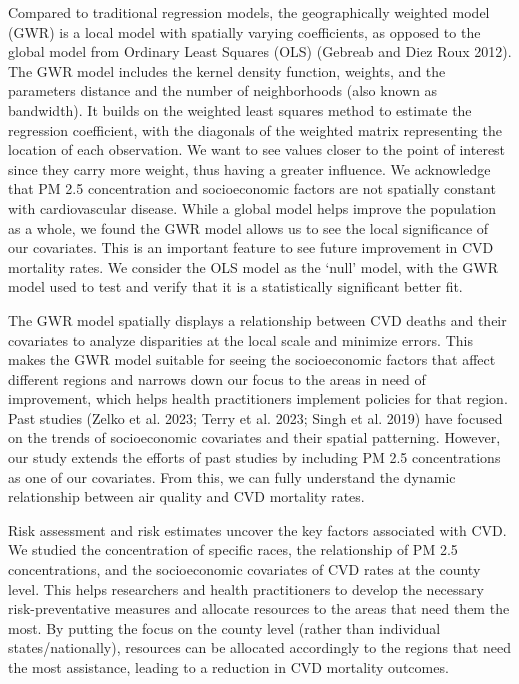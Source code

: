 \documentclass[
]{article}
\begin{document}
Compared to traditional regression models, the geographically weighted
model (GWR) is a local model with spatially varying coefficients, as
opposed to the global model from Ordinary Least Squares (OLS) (Gebreab
and Diez Roux 2012). The GWR model includes the kernel density function,
weights, and the parameters distance and the number of neighborhoods
(also known as bandwidth). It builds on the weighted least squares
method to estimate the regression coefficient, with the diagonals of the
weighted matrix representing the location of each observation. We want
to see values closer to the point of interest since they carry more
weight, thus having a greater influence. We acknowledge that PM 2.5
concentration and socioeconomic factors are not spatially constant with
cardiovascular disease. While a global model helps improve the
population as a whole, we found the GWR model allows us to see the local
significance of our covariates. This is an important feature to see
future improvement in CVD mortality rates. We consider the OLS model as
the `null' model, with the GWR model used to test and verify that it is
a statistically significant better fit.

The GWR model spatially displays a relationship between CVD deaths and
their covariates to analyze disparities at the local scale and minimize
errors. This makes the GWR model suitable for seeing the socioeconomic
factors that affect different regions and narrows down our focus to the
areas in need of improvement, which helps health practitioners implement
policies for that region. Past studies (Zelko et al. 2023; Terry et al.
2023; Singh et al. 2019) have focused on the trends of socioeconomic
covariates and their spatial patterning. However, our study extends the
efforts of past studies by including PM 2.5 concentrations as one of our
covariates. From this, we can fully understand the dynamic relationship
between air quality and CVD mortality rates.

Risk assessment and risk estimates uncover the key factors associated
with CVD. We studied the concentration of specific races, the
relationship of PM 2.5 concentrations, and the socioeconomic covariates
of CVD rates at the county level. This helps researchers and health
practitioners to develop the necessary risk-preventative measures and
allocate resources to the areas that need them the most. By putting the
focus on the county level (rather than individual states/nationally),
resources can be allocated accordingly to the regions that need the most
assistance, leading to a reduction in CVD mortality outcomes.~
\end{document}

